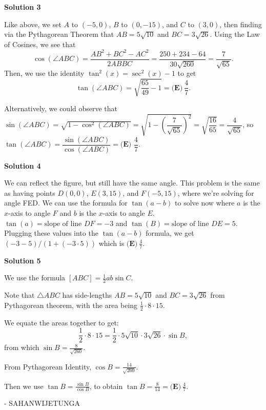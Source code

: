 \begin{enumerate}
 



\textbf{Solution 3}

Like above, we set $A$ to $(-5,0)$, $B$ to $(0, -15)$, and $C$ to $(3,0)$, then finding via the Pythagorean Theorem that $AB = 5 \sqrt{10}$ and $BC = 3 \sqrt{26}$. Using the Law of Cosines, we see that 
 \[\cos(\angle ABC) = \frac{AB^2 + BC^2 - AC^2}{2 AB BC} = \frac{250 + 234 - 64}{30 \sqrt{260}} = \frac{7}{\sqrt{65}}.\] Then, we use the identity $\tan^2(x) = \sec^2(x) - 1$ to get 
 \[\tan(\angle ABC) = \sqrt{\frac{65}{49} - 1} = \boxed{\textbf{(E)}\ \frac{4}{7}}.\]

 Alternatively, we could observe that $\sin(\angle ABC)=\sqrt{1-\cos^2(\angle ABC)}=\sqrt{1-\left(\dfrac7{\sqrt{65}}\right)^2}=\sqrt{\dfrac{16}{65}}=\dfrac4{\sqrt{65}}$, so $\tan(\angle ABC)=\dfrac{\sin(\angle ABC)}{\cos(\angle ABC)}=\boxed{\textbf{(E) }\dfrac47}$. 

 



\textbf{Solution 4}

We can reflect the figure, but still have the same angle. This problem is the same as having points $D(0,0)$, $E(3,15)$, and $F(-5,15)$, where we're solving for angle FED. We can use the formula for $\tan(a-b)$ to solve now where $a$ is the $x$-axis to angle $F$ and $b$ is the $x$-axis to angle $E$. $\tan(a) = \textrm{slope of line }DF = -3$ and $\tan(B) = \textrm{slope of line }DE = 5$. Plugging these values into the $\tan(a-b)$ formula, we get $(-3-5)/(1+(-3\cdot 5))$ which is $\boxed{\textbf{(E)}\ \frac{4}{7}}.$




\textbf{Solution 5}

We use the formula $[ABC]=\frac{1}{2}ab\sin{C}.$

 Note that $\triangle ABC$ has side-lengths $AB=5\sqrt{10}$ and $BC=3\sqrt{26}$ from Pythagorean theorem, with the area being $\frac12\cdot8\cdot15.$

 We equate the areas together to get: 
 \[\frac12\cdot8\cdot15=\frac12\cdot5\sqrt{10}\cdot3\sqrt{26}\cdot\sin{B},\]from which $\sin{B}=\frac{8}{\sqrt{260}}.$

 From Pythagorean Identity, $\cos{B}=\frac{14}{\sqrt{260}}.$

 Then we use $\tan{B}=\frac{\sin{B}}{\cos{B}}$, to obtain $\tan{B}=\frac{8}{14}=\boxed{\textbf{(E)}\ \frac{4}{7}}.$

 - SAHANWIJETUNGA

 




\end{enumerate}
